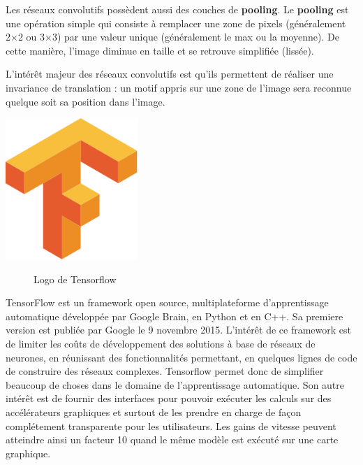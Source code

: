 Les réseaux convolutifs possèdent aussi des couches de \textbf{pooling}.
Le \textbf{pooling} est une opération simple qui consiste à remplacer une zone de pixels
(généralement 2×2 ou 3×3) par une valeur unique (généralement le max ou la moyenne).
De cette manière, l’image diminue en taille et se retrouve simplifiée (lissée).

L'intérêt majeur des réseaux convolutifs est qu'ils permettent de réaliser une invariance
de translation : un motif appris sur une zone de l'image sera reconnue
quelque soit sa position dans l'image.

\hypertarget{Tensorflow}{%
\label{Tensorflow}}

\begin{center}
\label{fig:Tensorflow_logo}
\centering
\includegraphics[width=5cm]{./images/Tensorflow_logo.png}
\begin{figure}[h!]
\caption{Logo de Tensorflow}
\end{figure}
\end{center}


TensorFlow est un framework open source,
multiplateforme d'apprentissage automatique développée par Google Brain,
en Python et en C++.
Sa premiere version est publiée par Google le 9 novembre 2015.
L'intérêt de ce framework est de limiter les coûts de développement des solutions à base
de réseaux de neurones, en réunissant des fonctionnalités permettant,
en quelques lignes de code de construire des réseaux complexes.
Tensorflow permet donc de simplifier beaucoup de choses dans
le domaine de l'apprentissage automatique.
Son autre intérêt est de fournir des interfaces pour pouvoir exécuter les calculs sur
des accélérateurs graphiques et surtout de les prendre en charge
de façon complétement transparente pour les utilisateurs.
Les gains de vitesse peuvent atteindre ainsi un facteur 10 quand le même modèle est exécuté
sur une carte graphique.

\hypertarget{plan}{%
\label{Présentation du plan du rapport}}
